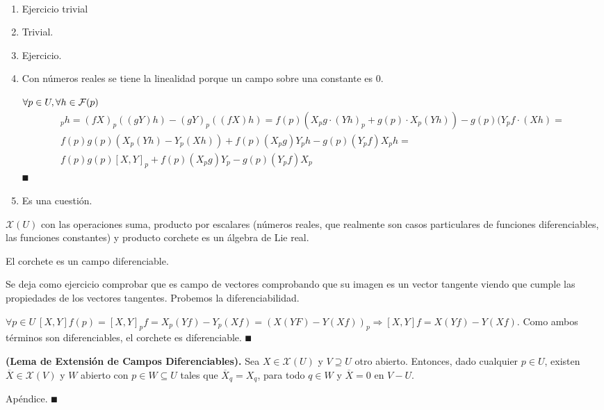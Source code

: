 \documentclass[Cursovd_portada.tex]{subfiles}
\begin{document}
\begin{dem}\
\begin{enumerate}
\item Ejercicio trivial
\item Trivial. 
\item Ejercicio.
\item Con números reales se tiene la linealidad porque un campo sobre una constante es 0. 

$\forall p\in U,\forall h\in\mathcal{F}(p)$
\begin{gather*}
[fX,gY]_ph=(fX)_p((gY)h)-(gY)_p((fX)h)=f(p)(X_pg\cdot(Yh)_p+g(p)\cdot X_p(Yh))-g(p)(Y_pf\cdot(Xh)=\\
f(p)g(p)(X_p(Yh)-Y_p(Xh))+f(p)(X_pg)Y_ph-g(p)(Y_pf)X_ph=\\
f(p)g(p)[X,Y]_p+f(p)(X_p g)Y_p-g(p)(Y_pf)X_p
\end{gather*}
$\QED$


\item Es una cuestión.
\end{enumerate}
\end{dem}
\begin{coro}
$\mathcal{X}(U)$ con las operaciones suma, producto por escalares (nú\-me\-ros reales, que realmente son casos
particulares de funciones diferenciables, las funciones constantes) y producto corchete es un álgebra de Lie real.
\end{coro}

\begin{prop}
El corchete es un campo diferenciable.
\end{prop}
\begin{dem}
Se deja como ejercicio comprobar que es campo de vectores comprobando que su imagen es un vector tangente viendo que cumple las propiedades de los vectores tangentes. Probemos la diferenciabilidad.

$\forall p\in U\ [X,Y]f(p)=[X,Y]_pf=X_p(Yf)-Y_p(Xf)=(X(YF)-Y(Xf))_p\Rightarrow [X,Y]f=X(Yf)-Y(Xf)$. Como ambos términos son diferenciables, el corchete es diferenciable. $\QED$
\end{dem}

\begin{teorema} {\bf (Lema de Extensión de Campos Diferenciables).} Sea $X\in\mathcal{X}(U)$ y $V\supseteq U$ otro abierto.
Entonces, dado cualquier $p\in U$, existen $\overline{X}\in\mathcal{X}(V)$ y $W$ abierto con $p\in W\subseteq U$
tales que $\overline{X}_q=X_q$, para todo $q\in W$ y $\overline{X}=0$ en $V-U$.
\end{teorema}
\begin{dem}
Apéndice. $\QED$
\end{dem}
\end{document}
